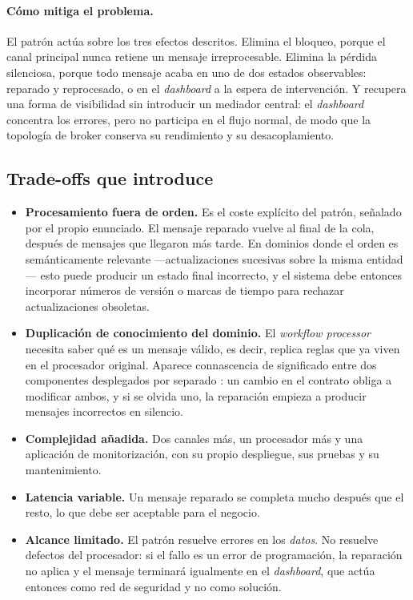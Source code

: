 \paragraph{Cómo mitiga el problema.} El patrón actúa sobre los tres efectos descritos. Elimina el bloqueo, porque el canal principal nunca retiene un mensaje irreprocesable. Elimina la pérdida silenciosa, porque todo mensaje acaba en uno de dos estados observables: reparado y reprocesado, o en el \emph{dashboard} a la espera de intervención. Y recupera una forma de visibilidad sin introducir un mediador central: el \emph{dashboard} concentra los errores, pero no participa en el flujo normal, de modo que la topología de broker conserva su rendimiento y su desacoplamiento.

\subsection{Trade-offs que introduce}

\begin{itemize}[leftmargin=1.5em]
  \item \textbf{Procesamiento fuera de orden.} Es el coste explícito del patrón, señalado por el propio enunciado. El mensaje reparado vuelve al final de la cola, después de mensajes que llegaron más tarde. En dominios donde el orden es semánticamente relevante ---actualizaciones sucesivas sobre la misma entidad--- esto puede producir un estado final incorrecto, y el sistema debe entonces incorporar números de versión o marcas de tiempo para rechazar actualizaciones obsoletas.
  \item \textbf{Duplicación de conocimiento del dominio.} El \emph{workflow processor} necesita saber qué es un mensaje válido, es decir, replica reglas que ya viven en el procesador original. Aparece connascencia de significado entre dos componentes desplegados por separado \parencite{pagejones1996}: un cambio en el contrato obliga a modificar ambos, y si se olvida uno, la reparación empieza a producir mensajes incorrectos en silencio.
  \item \textbf{Complejidad añadida.} Dos canales más, un procesador más y una aplicación de monitorización, con su propio despliegue, sus pruebas y su mantenimiento.
  \item \textbf{Latencia variable.} Un mensaje reparado se completa mucho después que el resto, lo que debe ser aceptable para el negocio.
  \item \textbf{Alcance limitado.} El patrón resuelve errores en los \emph{datos}. No resuelve defectos del procesador: si el fallo es un error de programación, la reparación no aplica y el mensaje terminará igualmente en el \emph{dashboard}, que actúa entonces como red de seguridad y no como solución.
\end{itemize}

